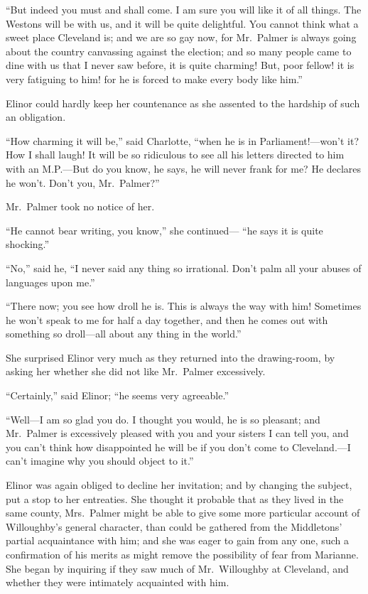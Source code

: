 ``But indeed you must and shall come.  I am sure you
will like it of all things.  The Westons will be with us,
and it will be quite delightful.  You cannot think
what a sweet place Cleveland is; and we are so gay now,
for Mr.\ Palmer is always going about the country canvassing
against the election; and so many people came to dine
with us that I never saw before, it is quite charming!  But,
poor fellow! it is very fatiguing to him! for he is forced
to make every body like him.''

Elinor could hardly keep her countenance as she
assented to the hardship of such an obligation.

``How charming it will be,'' said Charlotte, ``when he
is in Parliament!---won't it? How I shall laugh!  It will
be so ridiculous to see all his letters directed to him
with an M.P.---But do you know, he says, he will never frank
for me?  He declares he won't.  Don't you, Mr.\ Palmer?''

Mr.\ Palmer took no notice of her.

``He cannot bear writing, you know,'' she continued---%
``he says it is quite shocking.''

``No,'' said he, ``I never said any thing so irrational.
Don't palm all your abuses of languages upon me.''

``There now; you see how droll he is.  This is always
the way with him!  Sometimes he won't speak to me for half
a day together, and then he comes out with something
so droll---all about any thing in the world.''

She surprised Elinor very much as they returned
into the drawing-room, by asking her whether she did
not like Mr.\ Palmer excessively.

``Certainly,'' said Elinor; ``he seems very agreeable.''

``Well---I am so glad you do.  I thought you would,
he is so pleasant; and Mr.\ Palmer is excessively pleased
with you and your sisters I can tell you, and you can't
think how disappointed he will be if you don't come
to Cleveland.---I can't imagine why you should object
to it.''

Elinor was again obliged to decline her invitation;
and by changing the subject, put a stop to her entreaties.
She thought it probable that as they lived in the
same county, Mrs.\ Palmer might be able to give some
more particular account of Willoughby's general
character, than could be gathered from the Middletons'
partial acquaintance with him; and she was eager to gain
from any one, such a confirmation of his merits as might
remove the possibility of fear from Marianne.  She began
by inquiring if they saw much of Mr.\ Willoughby at Cleveland,
and whether they were intimately acquainted with him.

